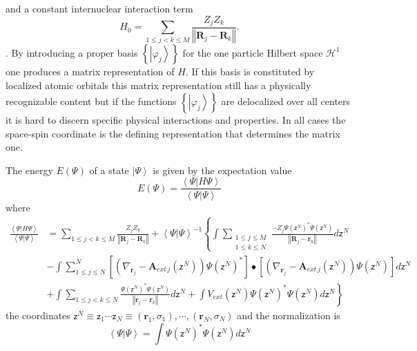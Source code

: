 \documentclass[aps,preprint]{revtex4}%
\begin{document}
and a constant internuclear interaction term
\begin{equation}
H_{0}=\sum_{1\leq j<k\leq M}\frac{Z_{j}Z_{k}}{\left\Vert \mathbf{R}%
_{j}-\mathbf{R}_{k}\right\Vert }.
\end{equation}
. By introducing a proper basis $\left\{  \left\vert \varphi_{j}\right\rangle
\right\}  $ for the one particle Hilbert space $\mathcal{H}^{1}$ one produces
a matrix representation of $H$. If this basis is constituted by localized
atomic orbitals this matrix representation still has a physically recognizable
content but if the functions $\left\{  \left\vert \varphi_{j}\right\rangle
\right\}  $ are delocalized over all centers it is hard to discern specific
physical interactions and properties. In all cases the space-spin coordinate
is the defining representation that determines the matrix one.

The energy $E\left(  \Psi\right)  $ of a state $\left\vert \Psi\right\rangle $
is given by the expectation value
\begin{equation}
E\left(  \Psi\right)  =\frac{\left\langle \Psi|H\Psi\right\rangle
}{\left\langle \Psi|\Psi\right\rangle }%
\end{equation}
where
\begin{align}
\frac{\left\langle \Psi|H\Psi\right\rangle }{\left\langle \Psi|\Psi
\right\rangle }  &  =\sum_{1\leq j<k\leq M}\frac{Z_{j}Z_{k}}{\left\Vert
\mathbf{R}_{j}-\mathbf{R}_{k}\right\Vert }+\left\langle \Psi|\Psi\right\rangle
^{-1}\left\{  \int\sum_{\substack{1\leq j\leq M\\1\leq k\leq N}}\frac
{-Z_{j}\Psi\left(  \mathsf{z}^{N}\right)  ^{\ast}\Psi\left(  \mathsf{z}%
^{N}\right)  }{\left\Vert \mathbf{R}_{j}-\mathbf{r}_{k}\right\Vert
}d\mathsf{z}^{N}\right. \nonumber\\
&  -\int\sum_{1\leq j\leq N}^{N}\left[  \left(  \nabla_{\mathbf{r}_{j}%
}-\mathbf{A}_{ext\,j}\left(  \mathsf{z}^{N}\right)  \right)  \Psi\left(
\mathsf{z}^{N}\right)  ^{\ast}\right]  \bullet\left[  \left(  \nabla
_{\mathbf{r}_{j}}-\mathbf{A}_{ext\,j}\left(  \mathsf{z}^{N}\right)  \right)
\Psi\left(  \mathsf{z}^{N}\right)  \right]  d\mathsf{z}^{N}\nonumber\\
&  +\left.  \int\sum_{1\leq j<k\leq N}\frac{\Psi\left(  \mathsf{z}^{N}\right)
^{\ast}\Psi\left(  \mathsf{z}^{N}\right)  }{\left\Vert \mathbf{r}%
_{j}-\mathbf{r}_{k}\right\Vert }d\mathsf{z}^{N}+\int V_{ext}\left(
\mathsf{z}^{N}\right)  \Psi\left(  \mathsf{z}^{N}\right)  ^{\ast}\Psi\left(
\mathsf{z}^{N}\right)  d\mathsf{z}^{N}\right\}
\end{align}
the coordinates $\mathsf{z}^{N}\equiv\mathsf{z}_{1}\cdots\mathsf{z}_{N}%
\equiv\left(  \mathbf{r}_{1},\sigma_{1}\right)  ,\cdots,\left(  \mathbf{r}%
_{N},\sigma_{N}\right)  $ and the normalization is
\begin{equation}
\left\langle \Psi|\Psi\right\rangle =\int\Psi\left(  \mathsf{z}^{N}\right)
^{\ast}\Psi\left(  \mathsf{z}^{N}\right)  d\mathsf{z}^{N}%
\end{equation}
\end{document}
